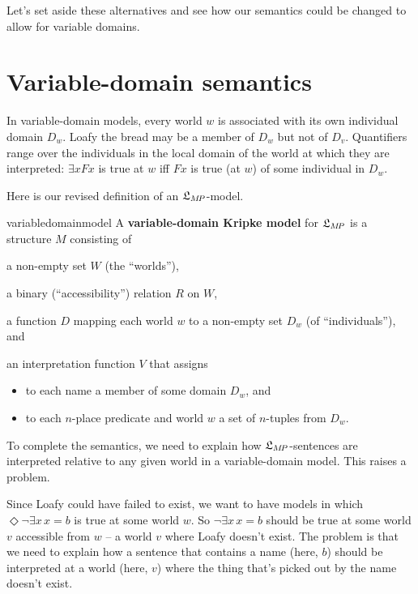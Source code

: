 Let's set aside these alternatives and see how our semantics could
be changed to allow for variable domains.

\section{Variable-domain semantics}\label{sec:variabledomains}

In variable-domain models, every world $w$ is associated with its own individual
domain $D_w$. Loafy the bread may be a member of $D_w$ but not of $D_v$.
Quantifiers range over the individuals in the local domain of the world at which
they are interpreted: $\exists x Fx$ is true at $w$ iff $Fx$ is true (at $w$) of
some individual in $D_w$.

Here is our revised definition of an $\mathfrak{L}_{M\!P}$-model.

\begin{definition}{}{variabledomainmodel}
  A \textbf{variable-domain Kripke model} for $\mathfrak{L}_{M\!P}$ is a structure $M$
  consisting of%
  \medskip
  \begin{compactenum}
  \item a non-empty set $W$ (the ``worlds''),
  \item a binary (``accessibility'') relation $R$ on $W$,
  \item a function $D$ mapping each world $w$ to a non-empty set $D_w$ (of ``individuals''), and
  \item an interpretation function $V$ that assigns
    \vspace{-1mm}
    \begin{itemize}
      \itemsep-1mm
      \item to each name a member of some domain $D_w$, and
      \item to each $n$-place predicate and world $w$ a set of $n$-tuples from
            $D_w$.
    \end{itemize}
  \end{compactenum}
\end{definition}

To complete the semantics, we need to explain how $\mathfrak{L}_{M\!P}$-sentences are
interpreted relative to any given world in a variable-domain model. This raises
a problem.

Since Loafy could have failed to exist, we want to have models in which
$\Diamond \neg \exists x\, {x\!=\!b}$ is true at some world $w$. So
$\neg \exists x\, x\!=\!b$ should be true at some world $v$ accessible from $w$
-- a world $v$ where Loafy doesn't exist. The problem
is that we need to explain how a sentence that contains a name (here, $b$)
should be interpreted at a world (here, $v$) where the thing that's picked out
by the name doesn't exist.

